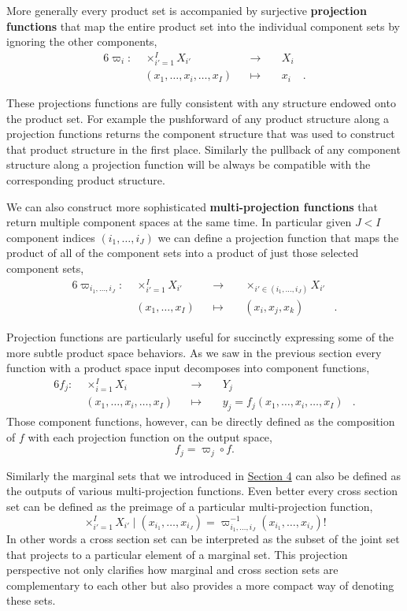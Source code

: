 \documentclass[
  letterpaper,
  DIV=11,
  numbers=noendperiod]{scrartcl}
\begin{document}
More generally every product set is accompanied by surjective
\textbf{projection functions} that map the entire product set into the
individual component sets by ignoring the other components,
\begin{alignat*}{6}
\varpi_{i} :\; & \times_{i' = 1}^{I} X_{i'} & &\rightarrow& \; & X_{i} &
\\
& (x_{1}, \ldots, x_{i}, \ldots, x_{I}) & &\mapsto& & x_{i} &.
\end{alignat*}

These projections functions are fully consistent with any structure
endowed onto the product set. For example the pushforward of any product
structure along a projection functions returns the component structure
that was used to construct that product structure in the first place.
Similarly the pullback of any component structure along a projection
function will be always be compatible with the corresponding product
structure.

We can also construct more sophisticated \textbf{multi-projection
functions} that return multiple component spaces at the same time. In
particular given \(J < I\) component indices
\(( i_{1}, \ldots, i_{J} )\) we can define a projection function that
maps the product of all of the component sets into a product of just
those selected component sets, \begin{alignat*}{6}
\varpi_{i_{1}, \ldots, i_{J}} :\; & \times_{i' = 1}^{I} X_{i'} & &\rightarrow& \;
& \times_{ i' \in ( i_{1}, \ldots, i_{J} ) } X_{i'} &
\\
& (x_{1}, \ldots, x_{I}) & &\mapsto& & (x_{i}, x_{j}, x_{k}) &.
\end{alignat*}

Projection functions are particularly useful for succinctly expressing
some of the more subtle product space behaviors. As we saw in the
previous section every function with a product space input decomposes
into component functions, \begin{alignat*}{6}
f_{j} :\; & \times_{i = 1}^{I} X_{i} & &\rightarrow& \; & Y_{j} &
\\
& (x_{1}, \ldots, x_{i}, \ldots, x_{I}) & &\mapsto&
& y_{j} = f_{j}(x_{1}, \ldots, x_{i}, \ldots, x_{I}) &.
\end{alignat*} Those component functions, however, can be directly
defined as the composition of \(f\) with each projection function on the
output space, \[
f_{j} = \varpi_{j} \circ f.
\]

Similarly the marginal sets that we introduced in
\href{@sec:decomposition}{Section 4} can also be defined as the outputs
of various multi-projection functions. Even better every cross section
set can be defined as the preimage of a particular multi-projection
function, \[
\times_{i' = 1}^{I} X_{i'} \mid (x_{i_{1}}, \ldots, x_{i_{J}})
=
\varpi_{i_{1}, \ldots, i_{J}}^{-1}(x_{i_{1}}, \ldots, x_{i_{J}})!
\] In other words a cross section set can be interpreted as the subset
of the joint set that projects to a particular element of a marginal
set. This projection perspective not only clarifies how marginal and
cross section sets are complementary to each other but also provides a
more compact way of denoting these sets.
\end{document}

